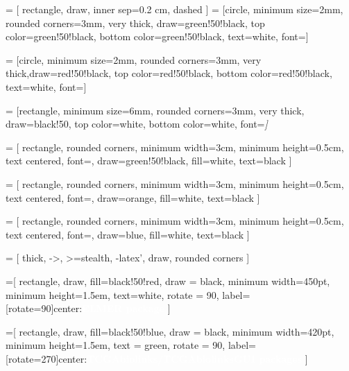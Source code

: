  = [
    rectangle,
    draw,
    inner sep=0.2 cm,
    dashed
]
 = [circle,
					 minimum size=2mm,
                     rounded corners=3mm,
					 very thick,
                     draw=green!50!black,
                     top color=green!50!black,
                     bottom color=green!50!black, 
                     text=white,
                     font=\tiny]

 = [circle,
				  minimum size=2mm,
                  rounded corners=3mm,
                  very thick,draw=red!50!black, 
                  top color=red!50!black,
                  bottom color=red!50!black, 
                  text=white,
                  font=\tiny]

 = [rectangle,
						minimum size=6mm,
                        rounded corners=3mm,
                        very thick,
                        draw=black!50, 
                        top color=white,
                        bottom color=white,
                        font=\itshape\footnotesize]

 = [
	rectangle, 
	rounded corners, 
    minimum width=3cm, 
    minimum height=0.5cm,
    text centered,
    font=\footnotesize, 
    draw=green!50!black, 
    fill=white, 
    text=black
]
                      
 = [
	rectangle, 
    rounded corners, 
    minimum width=3cm, 
    minimum height=0.5cm,
    text centered,
    font=\footnotesize,
    draw=orange, 
    fill=white, 
    text=black
]
                       
 = [
	rectangle, 
	rounded corners, 
    minimum width=3cm, 
    minimum height=0.5cm,
    text centered,
    font=\footnotesize, 
    draw=blue, 
    fill=white, 
    text=black
]

 = [
	thick,
    ->,
    >=stealth,
    -latex',
    draw,
    rounded corners
]

=[
	rectangle,
    draw,
    fill=black!50!red,
    draw = black,
    minimum width=450pt,
    minimum height=1.5em,
    text=white,
    rotate = 90, 
    label={[rotate=90]center:\textcolor{white}{\textbf{ELMER package}}}
]

=[
	rectangle,
	draw,
    fill=black!50!blue,
    draw = black,
    minimum width=420pt,
    minimum height=1.5em,
    text = green,
    rotate = 90, 
    label={[rotate=270]center:\textcolor{white}{\textbf{TCGAbiolinks/TCGAbiolinksGUI packages}}}
]


